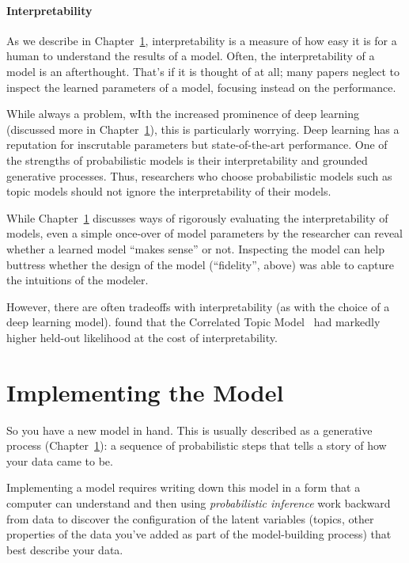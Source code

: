\paragraph{Interpretability}

As we describe in Chapter~\ref{}, interpretability is a measure of how
easy it is for a human to understand the results of a model.  Often,
the interpretability of a model is an afterthought.  That's if it is thought of
at all; many papers neglect to inspect the learned parameters of a
model, focusing instead on the performance.

While always a problem, wIth the increased prominence of deep learning (discussed more in
Chapter~\ref{}), this is particularly worrying.  Deep learning has a
reputation for inscrutable parameters but state-of-the-art
performance.  One of the strengths of probabilistic models is their
interpretability and grounded generative processes.  Thus, researchers who
choose probabilistic models such as topic models should not ignore the
interpretability of their models.

While Chapter~\ref{} discusses ways of rigorously evaluating the
interpretability of models, even a simple once-over of model
parameters by the researcher can reveal whether a learned model
``makes sense'' or not.  Inspecting the model can help buttress
whether the design of the model (``fidelity'', above) was able to
capture the intuitions of the modeler.

However, there are often tradeoffs with interpretability (as with the
choice of a deep learning model).  \citet{} found that the Correlated
Topic Model~\citep{} had markedly higher held-out likelihood at the
cost of interpretability.

\section{Implementing the Model}

So you have a new model in hand.  This is usually described as a
generative process (Chapter~\ref{}): a sequence of probabilistic steps
that tells a story of how your data came to be.

Implementing a model requires writing down this model in a form that a
computer can understand and then using \emph{probabilistic inference}
work backward from data to discover the configuration of the latent
variables (topics, other properties of the data you've added as part
of the model-building process) that best describe your data.

